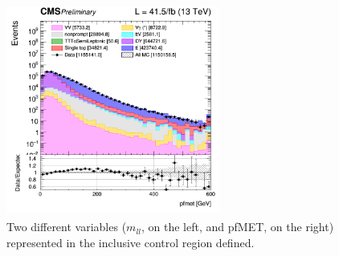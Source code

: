\documentclass[a4paper, 10pt, openright]{report}
\begin{document}
\begin{figure}[htbp]
{\begin{minipage}[b]{.48\textwidth}
\end{minipage}\hfill
\begin{minipage}[b]{.48\textwidth}
\includegraphics[width=7cm, height=7cm]{figs/2017/log_cratio_inclusiveCR_ll_METcorrected_pt.png}
\end{minipage} \hfill
}
\caption{Two different variables ($m_{ll}$, on the left, and pf\ac{MET}, on the right) represented in the inclusive control region defined.}
\label{fig:inclusiveCR}
\end{figure}
\end{document}
